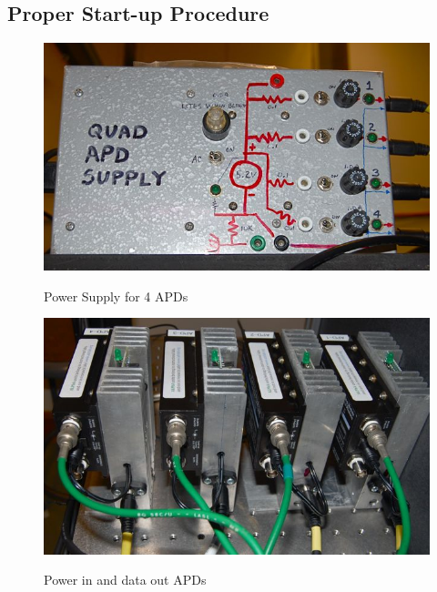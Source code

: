 \documentclass{../lab}
\begin{document}
\subsection{Proper Start-up Procedure}

\noindent
\begin{figure}[H]
\captionsetup{justification=centering}
  \href{http://experimentationlab.berkeley.edu/sites/default/files/images/QIE1.jpg}{\includegraphics[width=\linewidth,keepaspectratio]{images/QIE1.jpg}}
  \caption{Power Supply for 4 APDs}
  \label{fig:QIE1.jpg}
\endminipage\hfill
{}
  \href{http://experimentationlab.berkeley.edu/sites/default/files/images/QIE4.jpg}{\includegraphics[width=\linewidth,keepaspectratio]{images/QIE4.jpg}}
  \caption{Power in and data out APDs}
  \label{fig:QIE4.jpg}
\endminipage\hfill
{}

\end{figure}
\end{document}
